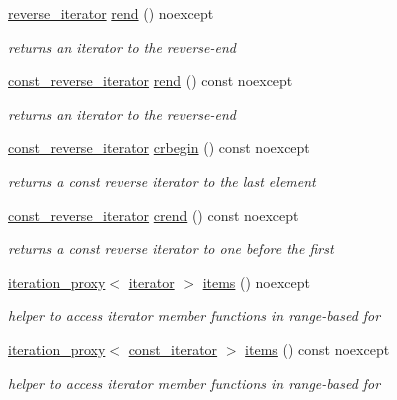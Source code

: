 \begin{DoxyCompactItemize}
\hyperlink{classnlohmann_1_1basic__json_a5b8c0ebedd920b507f4f7ff4e19bf3c6}{reverse\+\_\+iterator} \hyperlink{classnlohmann_1_1basic__json_a7a328b29b290cc300345376c54f618cb}{rend} () noexcept
\begin{DoxyCompactList}\small\item\em returns an iterator to the reverse-\/end \end{DoxyCompactList}\item 
\hyperlink{classnlohmann_1_1basic__json_aa7dba16ed9ee97380aeb17a207dd919a}{const\+\_\+reverse\+\_\+iterator} \hyperlink{classnlohmann_1_1basic__json_a2e4cbf41d593d41847b90aea55e5e84d}{rend} () const noexcept
\begin{DoxyCompactList}\small\item\em returns an iterator to the reverse-\/end \end{DoxyCompactList}\item 
\hyperlink{classnlohmann_1_1basic__json_aa7dba16ed9ee97380aeb17a207dd919a}{const\+\_\+reverse\+\_\+iterator} \hyperlink{classnlohmann_1_1basic__json_a044298d189bdf7e4b36492de9811ddd6}{crbegin} () const noexcept
\begin{DoxyCompactList}\small\item\em returns a const reverse iterator to the last element \end{DoxyCompactList}\item 
\hyperlink{classnlohmann_1_1basic__json_aa7dba16ed9ee97380aeb17a207dd919a}{const\+\_\+reverse\+\_\+iterator} \hyperlink{classnlohmann_1_1basic__json_a223480466a0922267d680ec8f0722d58}{crend} () const noexcept
\begin{DoxyCompactList}\small\item\em returns a const reverse iterator to one before the first \end{DoxyCompactList}\item 
\hyperlink{classnlohmann_1_1detail_1_1iteration__proxy}{iteration\+\_\+proxy}$<$ \hyperlink{classnlohmann_1_1basic__json_aa549b2b382916b3baafb526e5cb410bd}{iterator} $>$ \hyperlink{classnlohmann_1_1basic__json_a916a6ba75ec7624e9c6c977a52d6fd17}{items} () noexcept
\begin{DoxyCompactList}\small\item\em helper to access iterator member functions in range-\/based for \end{DoxyCompactList}\item 
\hyperlink{classnlohmann_1_1detail_1_1iteration__proxy}{iteration\+\_\+proxy}$<$ \hyperlink{classnlohmann_1_1basic__json_aebd2cfa7e4ded4e97cde9269bfeeea38}{const\+\_\+iterator} $>$ \hyperlink{classnlohmann_1_1basic__json_a4faaed730a81347f2f01e93f37c73823}{items} () const noexcept
\begin{DoxyCompactList}\small\item\em helper to access iterator member functions in range-\/based for \end{DoxyCompactList}\end{DoxyCompactItemize}
